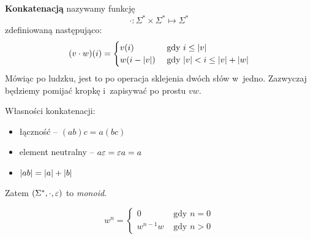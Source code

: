 \begin{definition}
    \textbf{Konkatenacją} nazywamy funkcję
        \begin{equation*}
            {\cdot}\colon \Sigma^* \times \Sigma^* \mapsto \Sigma^*
        \end{equation*}
        zdefiniowaną następująco:
        \begin{equation*}
            \pars{v \cdot w}\pars{i} = \begin{cases}
                v\pars{i} & \text{ gdy } i \leq \len{v}\\
                w\pars{i - \len{v}} & \text{ gdy } \len{v} < i \leq \len{v} + \len{w}
            \end{cases}
        \end{equation*}
        Mówiąc po ludzku, jest to po operacja sklejenia dwóch słów w~jedno.
        Zazwyczaj będziemy pomijać kropkę i~zapisywać po prostu \(vw\).
\end{definition}
Własności konkatenacji:
\begin{itemize}
    \item łączność -- \( (ab)c = a(bc) \)
    \item element neutralny -- \( a\varepsilon = \varepsilon a = a \)
    \item \(\len{ab} = \len{a} + \len{b}\)
\end{itemize}
Zatem \( (\Sigma ^*, \cdot , \varepsilon) \) to \emph{monoid}.
\begin{definition}
\[
    w^n = \begin{cases}
        0 & \text{ gdy } n = 0 \\
        w^{n-1}w & \text{ gdy } n > 0 
    \end{cases}
\]
\end{definition}

